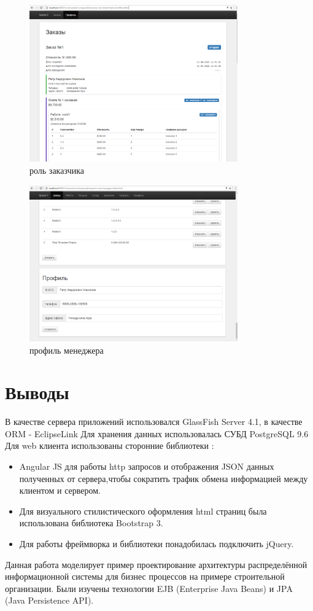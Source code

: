 \begin{figure}[!ht]
	\centering
	\includegraphics[width=0.8\textwidth]{img/client.png}
	\caption{роль заказчика}
\end{figure}
\begin{figure}[!ht]
	\centering
	\includegraphics[width=0.8\textwidth]{img/profile.png}
	\caption{профиль менеджера}
\end{figure}
\newpage
\section{Выводы}
В качестве сервера приложений использовался GlassFish Server 4.1, в качестве ORM - EclipseLink
Для хранения данных использовалась СУБД PostgreSQL 9.6
Для web клиента использованы сторонние библиотеки :
\begin{itemize}
\item Angular JS для работы http запросов и отображения JSON данных полученных от сервера,чтобы сократить трафик обмена информацией между клиентом и сервером.
\item Для визуального стилистического оформления html страниц была использована библиотека Bootstrap 3.
\item Для работы фреймворка и библиотеки понадобилась подключить jQuery.
\end{itemize}
Данная работа моделирует пример проектирование архитектуры распределённой информационной системы для бизнес процессов на примере строительной организации. Были изучены технологии EJB (Enterprise Java Beans) и JPA (Java Persistence API).
